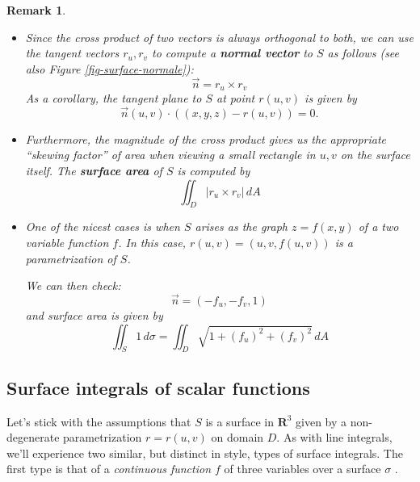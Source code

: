 \documentclass[12pt]{article}
\numberwithin{equation}{subsection}
\numberwithin{figure}{subsection}
\theoremstyle{note}
\newtheorem{remark}[subsection]{Remark}
\begin{document}
{\begin{remark}
\begin{itemize}
	\item Since the cross product of two vectors is always orthogonal to both, we can use the tangent  vectors $r_u,r_v$ to compute a \textbf{normal vector} to $S$ as follows (see also Figure \ref{fig-surface-normale}): \begin{equation} \label{unit-normal} \vec{n}=r_u \times r_v \end{equation}
	As a corollary, the \textit{tangent plane} to $S$ at point $r(u,v)$ is given by \[\vec{n}(u,v) \cdot ((x,y,z)-r(u,v))=0.\]

	\item Furthermore, the magnitude of the cross product gives us the appropriate ``skewing factor'' of area when viewing a small rectangle in $u,v$ on the surface itself. The \textbf{surface area} of $S$ is computed by \begin{equation} \label{SA}  \iint_D |r_u \times r_v| \,dA\end{equation}
	
	\item One of the nicest cases is when $S$ arises as the graph $z=f(x,y)$ of a two variable function $f$. In this case, $r(u,v)=(u,v,f(u,v))$ is a parametrization of $S$. 
	
	We can then check: \[ \vec{n} = (-f_u,-f_v,1) \] and surface area is given by  \begin{equation} \label{eq-SA} \iint_S 1\,d\sigma= \iint_D \sqrt{ 1+ (f_u)^2+(f_v)^2 }\,dA\end{equation}

\end{itemize}
\end{remark}




\subsection{Surface integrals of scalar functions} Let's stick with the assumptions that $S$ is a surface in $\mathbf{R}^3$ given by a non-degenerate parametrization $r=r(u,v)$ on domain $D$.  As with line integrals, we'll experience two similar, but distinct in style, types of surface integrals. The first type is that of a \textit{continuous function $f$} of three variables over a surface $\sigma$ . 

}
\end{document}
